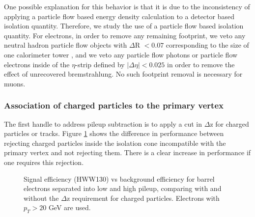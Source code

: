 One possible explanation for this behavior is that it is due to the inconsistency of applying
a particle flow based energy density calculation to a detector based isolation quantity. Therefore,
we study the use of a particle flow based isolation quantity. For electrons, in order to 
remove any remaining footprint, we veto any neutral hadron particle flow objects with
$\Delta$R $ < 0.07$ corresponding to the size of one calorimeter tower , and we 
veto any particle flow photons or particle flow electrons inside of the $\eta$-strip defined by
$|\Delta\eta| < 0.025$ in order to remove the effect of unrecovered bremstrahlung. No such
footprint removal is necessary for muons.


\subsubsection{Association of charged particles to the primary vertex}

The first handle to address pileup subtraction is to apply a cut in $\Delta$z for 
charged particles or tracks. Figure \ref{fig:IsoPerformance_EleBarrel_dZCut} shows the difference
in performance between rejecting charged particles inside the isolation cone 
incompatible with the primary vertex and not rejecting them. There is a clear increase
in performance if one requires this rejection.

\begin{figure}[!htbp]
\begin{center}
\caption{ Signal efficiency (HWW130) vs background efficiency for barrel electrons separated into 
low and high pileup, comparing with and without the $\Delta$z requirement for charged particles.
Electrons with $p_{T} > 20$ GeV are used. }
\label{fig:IsoPerformance_EleBarrel_dZCut}
\end{center}
\end{figure}


